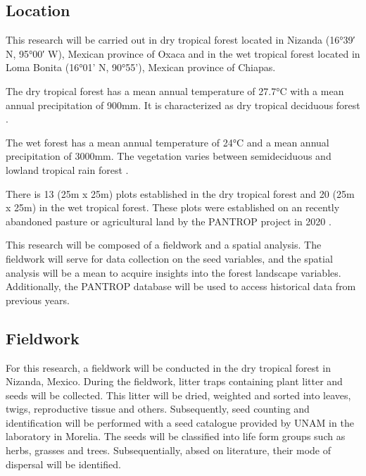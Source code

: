 

\subsection{Location}
This research will be carried out in dry tropical forest located in Nizanda (16°39′ N, 95°00′ W), Mexican province of Oxaca and in the wet tropical forest located in Loma Bonita (16°01’ N, 90°55’), Mexican province of Chiapas. 

The dry tropical forest has a mean annual temperature of 27.7°C with a mean annual precipitation of 900mm. It is characterized as dry tropical deciduous forest \citep{hordijkLandUseHistory2024}. 

The wet forest has a mean annual temperature of 24°C and a mean annual precipitation of 3000mm. The vegetation varies between semideciduous and lowland tropical rain forest \citep{hordijkLandUseHistory2024}.

There is 13 (25m x 25m) plots established in the dry tropical forest and 20 (25m x 25m) in the wet tropical forest. These plots were established on an recently abandoned pasture or agricultural land by the PANTROP project in 2020 \citep{hordijkLandUseHistory2024}.

This research will be composed of a fieldwork and a spatial analysis. The fieldwork will serve for data collection on the seed variables, and the spatial analysis will be a mean to acquire insights into the forest landscape variables. 
Additionally, the PANTROP database will be used to access historical data from previous years. 

\subsection{Fieldwork}
For this research, a fieldwork will be conducted in the dry tropical forest in Nizanda, Mexico. During the fieldwork, litter traps containing plant litter and seeds will be collected. This litter will be dried, weighted and sorted into leaves, twigs, reproductive tissue and others. 
Subsequently, seed counting and identification will be performed with a seed catalogue provided by UNAM in the laboratory in Morelia. The seeds will be classified into life form groups such as herbs, grasses and trees. Subsequentially, absed on literature, their mode of dispersal will be identified.

